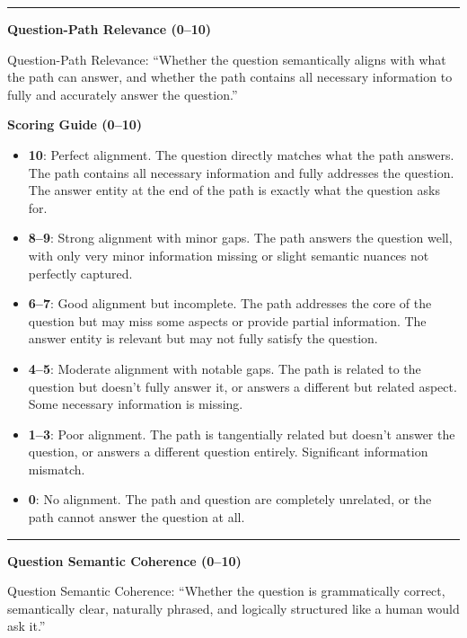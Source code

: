 \begin{tcolorbox}
\vspace{0.4em}
\hrule
\vspace{0.4em}

\textbf{Question-Path Relevance (0--10)}

Question-Path Relevance: ``Whether the question semantically aligns with what the path can answer, and whether the path contains all necessary information to fully and accurately answer the question.''

\textbf{Scoring Guide (0--10)}
\begin{itemize}
  \item \textbf{10}: Perfect alignment. The question directly matches what the path answers. The path contains all necessary information and fully addresses the question. The answer entity at the end of the path is exactly what the question asks for.
  \item \textbf{8--9}: Strong alignment with minor gaps. The path answers the question well, with only very minor information missing or slight semantic nuances not perfectly captured.
  \item \textbf{6--7}: Good alignment but incomplete. The path addresses the core of the question but may miss some aspects or provide partial information. The answer entity is relevant but may not fully satisfy the question.
  \item \textbf{4--5}: Moderate alignment with notable gaps. The path is related to the question but doesn't fully answer it, or answers a different but related aspect. Some necessary information is missing.
  \item \textbf{1--3}: Poor alignment. The path is tangentially related but doesn't answer the question, or answers a different question entirely. Significant information mismatch.
  \item \textbf{0}: No alignment. The path and question are completely unrelated, or the path cannot answer the question at all.
\end{itemize}

\vspace{0.4em}
\hrule
\vspace{0.4em}

\textbf{Question Semantic Coherence (0--10)}

Question Semantic Coherence: ``Whether the question is grammatically correct, semantically clear, naturally phrased, and logically structured like a human would ask it.''


\end{tcolorbox}
